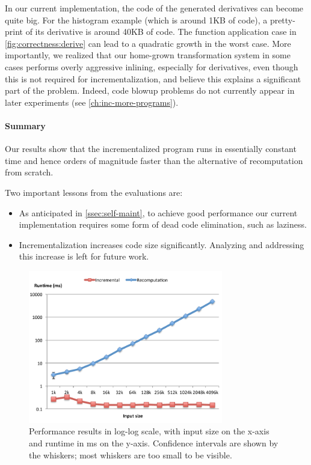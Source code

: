 In our current implementation, the code of the generated
derivatives can become quite big. For the histogram example
(which is around 1KB of code), a pretty-print of its derivative
is around 40KB of code. The function application case in
\cref{fig:correctness:derive} can lead to a quadratic growth in
the worst case. More importantly, we realized that our home-grown
transformation system in some cases performs overly aggressive
inlining, especially for derivatives, even though this is not
required for incrementalization, and believe this explains a
significant part of the problem. Indeed, code blowup problems do
not currently appear in later experiments (see
\cref{ch:inc-more-programs}). 

\paragraph{Summary}
Our results show that the incrementalized program runs
in essentially constant time and hence orders of magnitude faster than
the alternative of recomputation from scratch.

Two important lessons from the evaluations are:
\begin{itemize}
\item As anticipated in \cref{ssec:self-maint}, to achieve good performance our current
  implementation requires some form of dead code elimination, such as laziness.
\item Incrementalization increases code size significantly.
  Analyzing and addressing this increase is left for future work.
\end{itemize}

\begin{figure}
\includegraphics[keepaspectratio,width=8.5cm]{pldi14/HistogramGenerated-new.pdf}
\caption{Performance results in log-log scale, with input size on
  the x-axis and runtime in ms on the y-axis. Confidence
  intervals are shown by the whiskers; most whiskers are
  too small to be visible.}
\label{fig:graph}
\end{figure}
